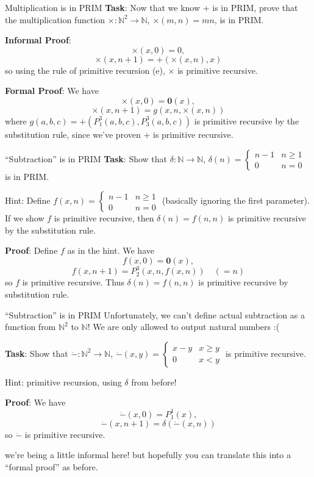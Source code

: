 \documentclass{beamer}
\newcommand{\N}{\mathbb N}
\begin{document}
\begin{frame}{Multiplication is in PRIM}
\textbf{Task}: Now that we know $+$ is in PRIM, prove that the multiplication function $\times: \N^2 \to \N$, $\times(m, n) = mn$, is in PRIM.

\pause

\textbf{Informal Proof}:
$$\times(x, 0) = 0,$$
$$\times(x, n + 1) = +(\times(x, n), x)$$
so using the rule of primitive recursion (e), $\times$ is primitive recursive.

\textbf{Formal Proof}:
We have
$$\times(x, 0) = \mathbf 0(x),$$
$$\times(x, n + 1) = g(x, n, \times(x, n))$$
where $g(a, b, c) = +(P_1^3(a, b, c), P_3^3(a, b, c))$ is primitive recursive by the substitution rule, since we've proven $+$ is primitive recursive.
\end{frame}

\begin{frame}{``Subtraction'' is in PRIM}
\textbf{Task}: Show that $\delta: \N \to \N$, $\delta(n) = \begin{cases} n - 1 & n \geq 1\\ 0 & n = 0\end{cases}$ is in PRIM. 

Hint: Define $f(x, n) = \begin{cases} n - 1 & n \geq 1\\ 0 & n = 0\end{cases}$ (basically ignoring the first parameter). If we show $f$ is primitive recursive, then $\delta(n) = f(n, n)$ is primitive recursive by the substitution rule.

\pause

\textbf{Proof}: 
Define $f$ as in the hint. We have
$$f(x, 0) = \mathbf 0(x),$$
$$f(x, n + 1) = P_2^3(x, n, f(x, n)) \quad (=n)$$
so $f$ is primitive recursive. Thus $\delta(n) = f(n, n)$ is primitive recursive by substitution rule.
\end{frame}

\begin{frame}{``Subtraction'' is in PRIM}
Unfortunately, we can't define actual subtraction as a function from $\N^2$ to $\N$! We are only allowed to output natural numbers :(

\pause

\textbf{Task}: Show that $\dot{-}: \N^2 \to \N$, $\dot{-}(x, y) = \begin{cases} x - y & x \geq y\\ 0 & x < y\end{cases}$ is primitive recursive.

Hint: primitive recursion, using $\delta$ from before!

\pause

\textbf{Proof}:
We have
$$\dot{-}(x, 0) = P_1^1(x),$$
$$\dot{-}(x, n + 1) = \delta(\dot{-}(x, n))$$
so $\dot{-}$ is primitive recursive.

\tiny{we're being a little informal here! but hopefully you can translate this into a ``formal proof'' as before.}
\end{frame}
\end{document}
